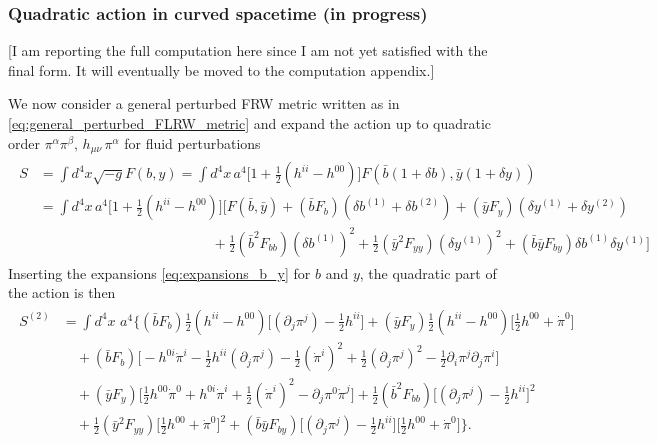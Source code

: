 \subsubsection{Quadratic action in curved spacetime {\color{red}(in progress)}}
\label{sec:qudratic_action_curved_spacetime}
%
{\color{red}[I am reporting the full computation here since I am not yet satisfied with the final form. It will eventually be moved to the computation appendix.]}

\noindent
We now consider a general perturbed FRW metric written as in \eqref{eq:general_perturbed_FLRW_metric} and expand the action up to quadratic order  $\pi^\alpha \pi^\beta,\,h_{\mu\nu}\,\pi^\alpha$ for fluid perturbations
{\small\begin{align}
\begin{aligned}
    S&=\int d^4x \sqrt{-g} F(b,y) = \int d^4x\,a^4 \big[1+\tfrac12 (h^{ii}-h^{00}) \big] F(\bar{b}(1+\delta b), \bar{y}(1+\delta y))
    \\
    &= \int \!\!\!d^4\!x\, a^4 \!\big[1+\tfrac12 (h^{ii}-h^{00}) \big]
    \Bigg[ F(\bar{b}, \bar{y}) + (\bar{b}F_b)  (\delta b^{(1)} + \delta b^{(2)}) + (\bar{y}F_y) (\delta y^{(1)} + \delta y^{(2)})\\
    &\,\,\qquad\qquad\qquad\qquad\qquad\qquad+ \tfrac12 (\bar{b}^2 F_{bb})(\delta b^{(1)})^2 + \tfrac12 (\bar{y}^2 F_{yy}) (\delta y^{(1)})^2
    + (\bar{b}\bar{y} F_{by}) \delta b^{(1)} \delta y^{(1)} \Bigg]
\end{aligned}
\end{align}}
Inserting the expansions \eqref{eq:expansions_b_y} for $b$ and $y$, the quadratic part of the action is then
{\small\begin{align}
\begin{aligned}
    S^{(2)}&=\int d^4x\,\, a^4 \bigg\{
        (\bar{b}F_b) \tfrac12(h^{ii}-h^{00}) \Big[(\partial_j \pi^j) - \tfrac12 h^{ii}\Big]
        + (\bar{y}F_y) \tfrac12 (h^{ii}-h^{00}) \Big[\tfrac12 h^{00}+ \dot{\pi}^0\Big]\\
    &\quad + (\bar{b}F_b) \Big[ - h^{0 i} \dot{\pi}^i - \tfrac12  h^{ii} (\partial_j \pi^j) - \tfrac12 (\dot{\pi}^i)^2 + \tfrac12 (\partial_j \pi^j)^2 -\tfrac12 \partial_i\pi^j\partial_j\pi^i\Big]
    \\
    &\quad + (\bar{y}F_y) \Big[ \tfrac12 h^{00}\dot{\pi}^0+ h^{0 i} \dot{\pi}^i + \tfrac12 (\dot{\pi}^i)^2 -\partial_j\pi^0\dot{\pi}^j\Big]
    + \tfrac12 (\bar{b}^2 F_{bb})\Big[ (\partial_j \pi^j) - \tfrac12 h^{ii}\Big]^2
    \\
    &\quad + \tfrac12 (\bar{y}^2 F_{yy})\Big[\tfrac12 h^{00}+ \dot{\pi}^0\Big]^2
    + (\bar{b}\bar{y} F_{by}) \Big[(\partial_j \pi^j) - \tfrac12 h^{ii}\Big]\Big[\tfrac12 h^{00}+ \dot{\pi}^0\Big]
        \bigg\}.
\end{aligned}
\end{align}}
